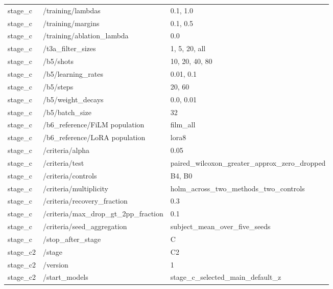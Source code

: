 \begin{longtable}{p{.65in}p{2.8in}p{3.2in}}
stage\_\allowbreak{}c & /training/lambdas & 0.1, 1.0 \\
stage\_\allowbreak{}c & /training/margins & 0.1, 0.5 \\
stage\_\allowbreak{}c & /training/ablation\_\allowbreak{}lambda & 0.0 \\
stage\_\allowbreak{}c & /t3a\_\allowbreak{}filter\_\allowbreak{}sizes & 1, 5, 20, all \\
stage\_\allowbreak{}c & /b5/shots & 10, 20, 40, 80 \\
stage\_\allowbreak{}c & /b5/learning\_\allowbreak{}rates & 0.01, 0.1 \\
stage\_\allowbreak{}c & /b5/steps & 20, 60 \\
stage\_\allowbreak{}c & /b5/weight\_\allowbreak{}decays & 0.0, 0.01 \\
stage\_\allowbreak{}c & /b5/batch\_\allowbreak{}size & 32 \\
stage\_\allowbreak{}c & /b6\_\allowbreak{}reference/FiLM population & film\_\allowbreak{}all \\
stage\_\allowbreak{}c & /b6\_\allowbreak{}reference/LoRA population & lora8 \\
stage\_\allowbreak{}c & /criteria/alpha & 0.05 \\
stage\_\allowbreak{}c & /criteria/test & paired\_\allowbreak{}wilcoxon\_\allowbreak{}greater\_\allowbreak{}approx\_\allowbreak{}zero\_\allowbreak{}dropped \\
stage\_\allowbreak{}c & /criteria/controls & B4, B0 \\
stage\_\allowbreak{}c & /criteria/multiplicity & holm\_\allowbreak{}across\_\allowbreak{}two\_\allowbreak{}methods\_\allowbreak{}two\_\allowbreak{}controls \\
stage\_\allowbreak{}c & /criteria/recovery\_\allowbreak{}fraction & 0.3 \\
stage\_\allowbreak{}c & /criteria/max\_\allowbreak{}drop\_\allowbreak{}gt\_\allowbreak{}2pp\_\allowbreak{}fraction & 0.1 \\
stage\_\allowbreak{}c & /criteria/seed\_\allowbreak{}aggregation & subject\_\allowbreak{}mean\_\allowbreak{}over\_\allowbreak{}five\_\allowbreak{}seeds \\
stage\_\allowbreak{}c & /stop\_\allowbreak{}after\_\allowbreak{}stage & C \\
stage\_\allowbreak{}c2 & /stage & C2 \\
stage\_\allowbreak{}c2 & /version & 1 \\
stage\_\allowbreak{}c2 & /start\_\allowbreak{}models & stage\_\allowbreak{}c\_\allowbreak{}selected\_\allowbreak{}main\_\allowbreak{}default\_\allowbreak{}z \\

\end{longtable}
